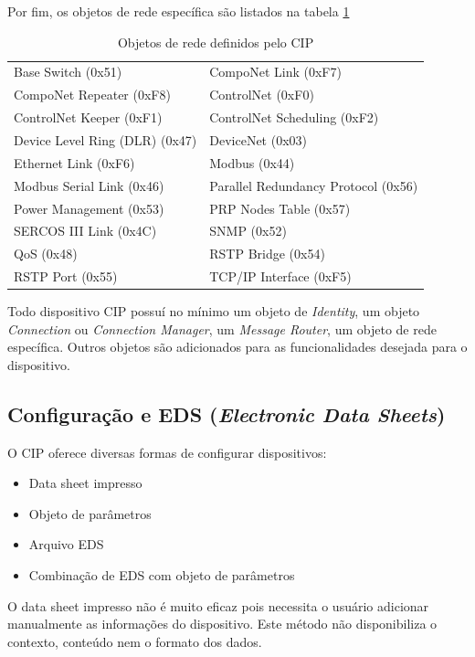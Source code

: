  Por fim, os objetos de rede específica são listados na tabela \ref{tab::objrede}
 
\begin{table}[H]
\begin{center}
\begin{tabular}{ll}
\hline
Base Switch (0x51)&
CompoNet Link (0xF7)\\
CompoNet Repeater (0xF8)&
ControlNet (0xF0)\\
ControlNet Keeper (0xF1)&
ControlNet Scheduling (0xF2)\\
Device Level Ring (DLR) (0x47)&
DeviceNet (0x03)\\
Ethernet Link (0xF6)&
Modbus (0x44)\\
Modbus Serial Link (0x46)&
Parallel Redundancy Protocol (0x56)\\
Power Management (0x53)&
PRP Nodes Table (0x57)\\
SERCOS III Link (0x4C)&
SNMP (0x52)\\
QoS (0x48)&
RSTP Bridge (0x54)\\
RSTP Port (0x55)&
TCP/IP Interface (0xF5)\\\hline
\end{tabular}
\end{center}
\caption{Objetos de rede definidos pelo CIP}
\label{tab::objrede}
\end{table}
 
 Todo dispositivo CIP possuí no mínimo um objeto de {\it Identity}, um objeto {\it Connection} ou {\it Connection Manager}, um {\it Message Router}, um objeto de rede específica. Outros objetos são adicionados para as funcionalidades desejada para o dispositivo.


\subsection{Configuração e  EDS ({\it Electronic Data Sheets})}
 
 O CIP oferece diversas formas de configurar dispositivos:
 
 \begin{itemize}
 \item Data sheet impresso
 \item Objeto de parâmetros
 \item Arquivo EDS
 \item Combinação de EDS com objeto de parâmetros
 \end{itemize}
 
 O data sheet impresso não é muito eficaz pois necessita o usuário adicionar manualmente as informações do dispositivo. Este método não disponibiliza o contexto, conteúdo nem o formato dos dados.
 
